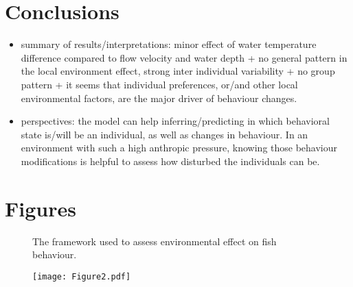 \documentclass{article}
\begin{document}
\begin{linenumbers}
\section{Conclusions}
\begin{itemize}
\item summary of results/interpretations: minor effect of water temperature difference compared to flow velocity and water depth + no general pattern in the local environment effect, strong inter individual variability + no group pattern + it seems that individual preferences, or/and other local environmental factors, are the major driver of behaviour changes.
\item perspectives: the model can help inferring/predicting in which behavioral state is/will be an individual, as well as changes in behaviour. In an environment with such a high anthropic pressure, knowing those behaviour modifications is helpful to assess how disturbed the individuals can be.
\end{itemize}


\section{Figures}

\begin{figure}
    \centering
    \caption{The framework used to assess environmental effect on fish behaviour.}
    \label{fig1}
\end{figure}

\begin{figure}
    \centering
    \texttt{[image: Figure2.pdf]}
    \caption{}
    \label{fig2}
\end{figure}

\end{linenumbers}
\end{document}
